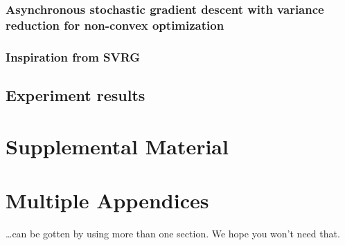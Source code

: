 \documentclass[11pt,a4paper]{article}
\begin{document}
\subsubsection{Asynchronous stochastic gradient descent with variance reduction for non-convex optimization}
\subsubsection{Inspiration from SVRG}
\subsection{Experiment results}




\appendix

\section{Supplemental Material}
\label{sec:supplemental}

\section{Multiple Appendices}
\dots can be gotten by using more than one section. We hope you won't
need that.
\end{document}
